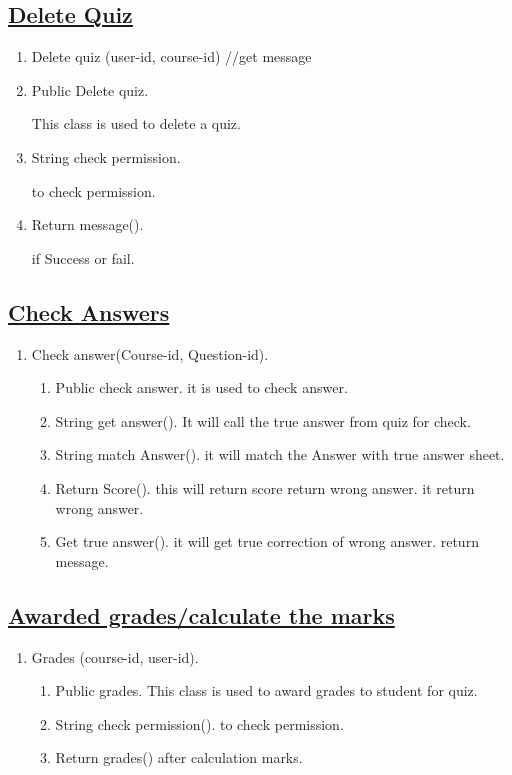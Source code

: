 \documentclass{article}
\begin{document}
\subsection*{\underline{Delete Quiz}}
\begin{enumerate}
\item Delete quiz (user-id, course-id)
//get message

\item Public Delete quiz.

\* This class is used to delete a quiz.

\item String check permission.

\* to check permission.

\item Return message().
 
\*if Success or fail.

\end{enumerate}

\subsection*{\underline{Check Answers}}
\begin{enumerate}

\item Check answer(Course-id, Question-id).
\begin{enumerate}
\item Public check answer.
\* it is used to check answer.
\item String get answer().
\* It will call the true answer from quiz for check.
\item String match Answer().
\* it will match the Answer with true answer sheet.
\item Return Score().
\* this will return score return wrong answer.
\* it return wrong answer.
\item Get true answer().
\* it will get true correction of wrong answer.
return message.
\end{enumerate}
\end{enumerate}

\subsection*{\underline{Awarded grades/calculate the marks}}
\begin{enumerate}

\item Grades (course-id, user-id).
\begin{enumerate}
\item Public grades.
\* This class is used to award grades to student for quiz.
\item String check permission().
\* to check permission.
\item Return grades()
\* after calculation marks.
\end{enumerate}
\end{enumerate}
\end{document}
